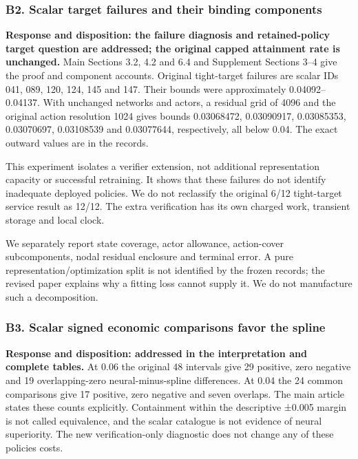 \documentclass[ecta,nameyear,draft]{econsocart}
\begin{document}
\hypertarget{b2-scalar-target-failures-and-their-binding-components}{%
\subsubsection{B2. Scalar target failures and their binding
components}\label{b2-scalar-target-failures-and-their-binding-components}}

\textbf{Response and disposition: the failure diagnosis and
retained-policy target question are addressed; the original capped
attainment rate is unchanged.} Main Sections 3.2, 4.2 and 6.4 and
Supplement Sections 3--4 give the proof and component accounts. Original
tight-target failures are scalar IDs 041, 089, 120, 124, 145 and 147.
Their bounds were approximately 0.04092--0.04137. With unchanged
networks and actors, a residual grid of 4096 and the original action
resolution 1024 gives bounds 0.03068472, 0.03090917, 0.03085353,
0.03070697, 0.03108539 and 0.03077644, respectively, all below 0.04. The
exact outward values are in the records.

This experiment isolates a verifier extension, not additional
representation capacity or successful retraining. It shows that these
failures do not identify inadequate deployed policies. We do not
reclassify the original 6/12 tight-target service result as 12/12. The
extra verification has its own charged work, transient storage and local
clock.

We separately report state coverage, actor allowance, action-cover
subcomponents, nodal residual enclosure and terminal error. A pure
representation/optimization split is not identified by the frozen
records; the revised paper explains why a fitting loss cannot supply it.
We do not manufacture such a decomposition.

\hypertarget{b3-scalar-signed-economic-comparisons-favor-the-spline}{%
\subsubsection{B3. Scalar signed economic comparisons favor the
spline}\label{b3-scalar-signed-economic-comparisons-favor-the-spline}}

\textbf{Response and disposition: addressed in the interpretation and
complete tables.} At 0.06 the original 48 intervals give 29 positive,
zero negative and 19 overlapping-zero neural-minus-spline differences.
At 0.04 the 24 common comparisons give 17 positive, zero negative and
seven overlaps. The main article states these counts explicitly.
Containment within the descriptive ±0.005 margin is not called
equivalence, and the scalar catalogue is not evidence of neural
superiority. The new verification-only diagnostic does not change any of
these policies\textquotesingle{} costs.
\end{document}
